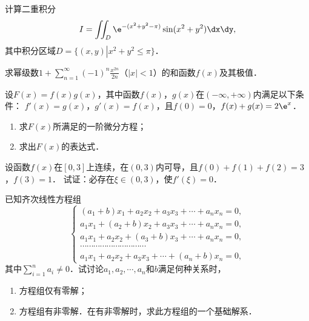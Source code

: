 \documentclass[plain,noanswer,medmath]{../../template/jnuexam}
\begin{document}
\begin{problem}
计算二重积分
$$I = \iint_D \e^{- (x^2 + y^2 - \pi)}\sin(x^2 + y^2)\dx\dy,$$
其中积分区域$D = \{(x,y)\left| x^2 + y^2 \le \pi \right.\}$．
\end{problem}



\begin{problem}
求幂级数$1 + \sum_{n = 1}^{\infty}(- 1)^n\frac{x^{2n}}{2n}$（$|x| < 1$）的和函数$f(x)$及其极值．
\end{problem}



\begin{problem}
设$F(x) = f(x)g(x)$，其中函数$f(x)$，$g(x)$在$(-\infty , +\infty)$内满足以下条件：\goodbreak
$f'(x) = g(x)$，$g'(x) = f(x)$，且$f(0) = 0$，$f(x) + g(x) = 2\e^x$．
\begin{enumerate}
\item 求$F(x)$所满足的一阶微分方程；
\item 求出$F(x)$的表达式．
\end{enumerate}
\end{problem}



\begin{problem}
设函数$f(x)$在$[0,3]$上连续，在$(0,3)$内可导，且$f(0) + f(1) + f(2) = 3$，$f(3) = 1$．
试证：必存在$\xi \in(0,3)$，使$f'(\xi) = 0$．
\end{problem}



\begin{problem}
已知齐次线性方程组
$$\begin{cases}
  (a_1 + b) x_1 + a_2x_2 + a_3x_3 + \cdots + a_n x_n = 0, \\
  a_1x_1 + (a_2 + b) x_2 + a_3x_3 + \cdots + a_n x_n = 0, \\
  a_1x_1 + a_2x_2 + (a_3 + b) x_3 + \cdots + a_n x_n = 0, \\
  \cdots \cdots \cdots \cdots \cdots \cdots \cdots \cdots \cdots \cdots \\
  a_1x_1 + a_2x_2 + a_3x_3 + \cdots + (a_n + b) x_n = 0,
\end{cases}$$
其中$\sum_{i = 1}^n a_i \ne 0$．试讨论$a_1,a_2, \cdots ,a_n$和$b$满足何种关系时，
\begin{enumerate}
\item 方程组仅有零解；
\item 方程组有非零解．在有非零解时，求此方程组的一个基础解系．
\end{enumerate}
\end{problem}
\end{document}
